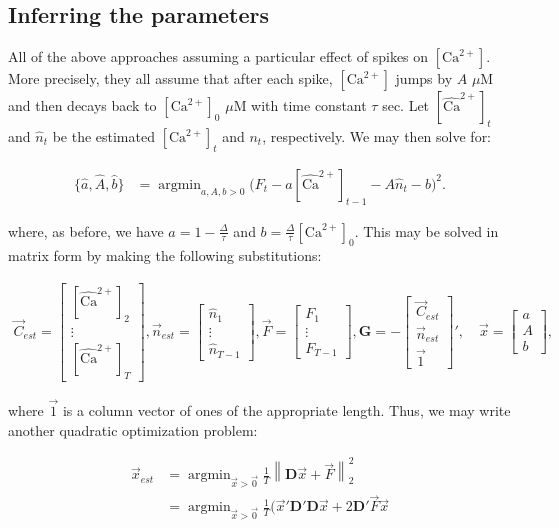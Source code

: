 \documentclass[12pt]{article}
\providecommand{\ve}[1]{\vec{#1}}
\providecommand{\ma}[1]{\boldsymbol{#1}}
\providecommand{\norm}[1]{\left \lVert#1 \right  \rVert}
\providecommand{\ve}[1]{\boldsymbol{#1}}
\DeclareMathOperator*{\argmin}{argmin}
\newcommand{\Ca}{[\text{Ca}^{2+}]}
\newcommand{\Cae}{[\widehat{\text{Ca}}^{2+}]}
\newcommand{\Cav}{\ve{C}}%
\begin{document}
\subsection{Inferring the parameters}

All of the above approaches assuming a particular effect of spikes on $\Ca$.  More precisely, they all assume that after each spike, $\Ca$ jumps by $A$ $\mu$M and then decays back to $\Ca_0$ $\mu$M with time constant $\tau$ sec.  Let $\Cae_t$ and $\widehat{n}_t$ be the estimated $\Ca_t$ and $n_t$, respectively.  We may then solve for:

\begin{align}
\{\widehat{a}, \widehat{A}, \widehat{b}\} &= \argmin_{a,A,b>0} \big(F_t - a \Cae_{t-1} - A \widehat{n}_t - b\big)^2.
\end{align}

\noindent where, as before, we have $a=1-\frac{\Delta}{\tau}$ and $b=\frac{\Delta}{\tau}\Ca_0$. This may be solved in matrix form by making the following substitutions:

\begin{align}
\Cav_{est} =\begin{bmatrix} \Cae_2\\ \vdots \\ \Cae_T \end{bmatrix},
\ve{n}_{est}=\begin{bmatrix} \widehat{n}_1\\ \vdots \\ \widehat{n}_{T-1} \end{bmatrix},
\ve{F}=\begin{bmatrix} F_1\\ \vdots \\ F_{T-1} \end{bmatrix},
\ma{G}=-\begin{bmatrix} \Cav_{est}\\ \ve{n}_{est}\\ \ve{1} \end{bmatrix}',
\quad \ve{x}=\begin{bmatrix} a\\ A\\ b \end{bmatrix},
\end{align}

\noindent where $\ve{1}$ is a column vector of ones of the appropriate length.  Thus, we may write another quadratic optimization problem:

\begin{align}
\ve{x}_{est}&=\argmin_{\ve{x}>\ve{0}} \frac{1}{T}\norm{\ma{D} \ve{x} + \ve{F}}_2^2\\
&=\argmin_{\ve{x}>\ve{0}} \frac{1}{T} (\ve{x}' \ma{D}'\ma{D} \ve{x} + 2 \ma{D}'\ve{F} \ve{x}
\end{align}
\end{document}
